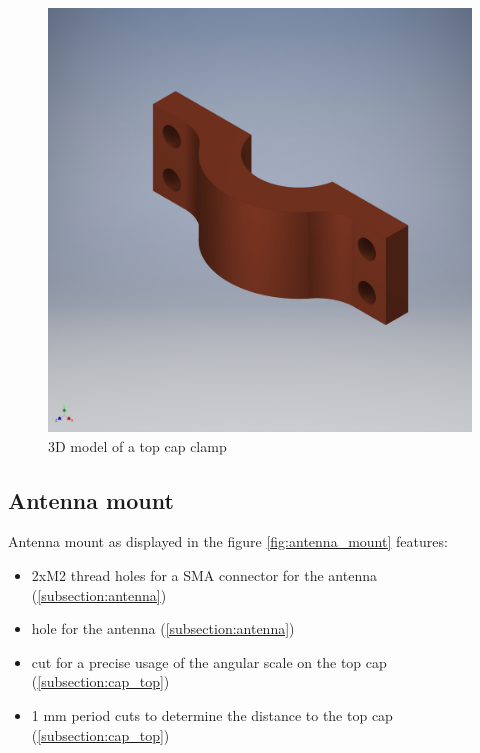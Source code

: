 \begin{figure}[h]
	\centering
	\includegraphics[width=\textwidth]{images/cap_top_movable}
	\caption{3D model of a top cap clamp}
	\label{fig:cap_top_clamp}
\end{figure}

\clearpage
\subsection{Antenna mount}
\label{subsection:antenna_mount}
Antenna mount as displayed in the figure \ref{fig:antenna_mount} features:
\begin{itemize}
	\item 2xM2 thread holes for a SMA connector for the antenna (\ref{subsection:antenna})
	\item hole for the antenna (\ref{subsection:antenna})
	\item cut for a precise usage of the angular scale on the top cap (\ref{subsection:cap_top})
	\item 1 mm period cuts to determine the distance to the top cap (\ref{subsection:cap_top})
\end{itemize}

